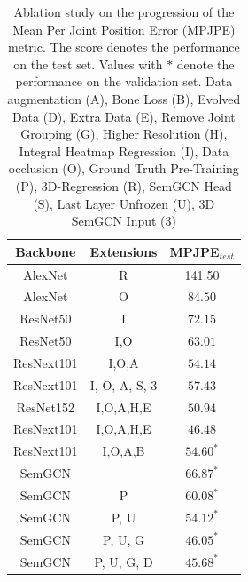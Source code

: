 \begin{table}[h!]
    \caption{Ablation study on the progression of the Mean Per Joint Position Error (MPJPE) metric.
    The score denotes the performance on the test set. Values with $*$  denote the performance on the validation set.
    Data augmentation (A), Bone Loss (B), %
    Evolved Data (D), Extra Data (E), Remove Joint Grouping (G), Higher Resolution (H),
    Integral Heatmap Regression (I), Data occlusion (O),
    Ground Truth Pre-Training (P), 3D-Regression (R), SemGCN Head (S),
    Last Layer Unfrozen (U), 3D SemGCN Input (3)}

    \label{tab:ablation}
    \centering
    \begin{tabular}{|| c | c | c ||}
        \hline
        \textbf{Backbone} & \textbf{Extensions} & \textbf{MPJPE}$_{test}$ \\
        \hline\hline
        AlexNet           & R                   & 141.50                  \\
        \hline
        AlexNet           & O                   & $84.50$                 \\
        \hline
        ResNet50          & I                   & $72.15$                 \\
        \hline
        ResNet50          & I,O                 & $63.01$                 \\
        \hline
        ResNext101        & I,O,A               & $54.14$                 \\
        \hline
        ResNext101        & I, O, A, S, 3       & $57.43$                 \\
        \hline
        ResNet152         & I,O,A,H,E           & $50.94$                 \\
        \hline
        ResNext101        & I,O,A,H,E           & $46.48$                 \\
        \hline
        ResNext101        & I,O,A,B             & $54.60^*$               \\
        \hline
        \hline
        SemGCN            &                     & $66.87^*$               \\
        \hline
        SemGCN            & P                   & $60.08^*$               \\
        \hline
        SemGCN            & P, U                & $54.12^*$               \\
        \hline
        SemGCN            & P, U, G             & $46.05^*$               \\
        \hline
        SemGCN            & P, U, G, D          & $45.68^*$               \\
        \hline
    \end{tabular}
\end{table}

